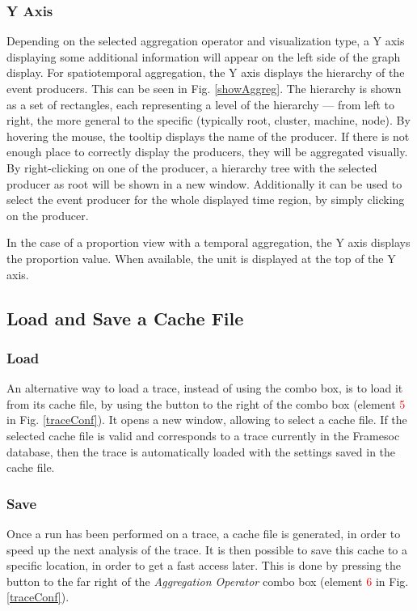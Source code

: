 \documentclass[twoside]{article}
\begin{document}
\begin{sloppypar}
\subsubsection{Y Axis}
Depending on the selected aggregation operator and visualization type, a Y axis displaying some additional information will appear on the left side of the graph display. For spatiotemporal aggregation, the Y axis displays the hierarchy of the event producers. This can be seen in Fig. \ref{showAggreg}. The hierarchy is shown as a set of rectangles, each representing a level of the hierarchy --- from left to right, the more general to the specific (typically root, cluster, machine, node). By hovering the mouse, the tooltip displays the name of the producer. If there is not enough place to correctly display the producers, they will be aggregated visually. By right-clicking on one of the producer, a hierarchy tree with the selected producer as root will be shown in a new window. Additionally it can be used to select the event producer for the whole displayed time region, by simply clicking on the producer.

In the case of a proportion view with a temporal aggregation, the Y axis displays the proportion value. When available, the unit is displayed at the top of the Y axis.

\subsection{Load and Save a Cache File}
\subsubsection{Load}
An alternative way to load a trace, instead of using the combo box, is to load it from its cache file, by using the button to the right of the combo box (element \textcolor{red}{5} in Fig. \ref{traceConf}). It opens a new window, allowing to select a cache file. If the selected cache file is valid and corresponds to a trace currently in the Framesoc database, then the trace is automatically loaded with the settings saved in the cache file.

\subsubsection{Save}
Once a run has been performed on a trace, a cache file is generated, in order to speed up the next analysis of the trace. It is then possible to save this cache to a specific location, in order to get a fast access later. This is done by pressing the button to the far right of the \textit{Aggregation Operator} combo box (element \textcolor{red}{6} in Fig. \ref{traceConf}).


\end{sloppypar}
\end{document}
